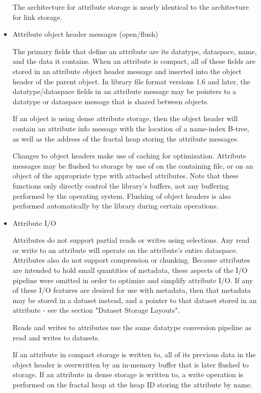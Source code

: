 \begin{itemize}
The architecture for attribute storage is nearly identical to the architecture for link storage.

    \item Attribute object header messages (open/flush)

The primary fields that define an attribute are its datatype, dataspace, name, and the data it contains. When an attribute is compact, all of these fields are stored in an attribute object header message and inserted into the object header of the parent object. In library file format versions 1.6 and later, the datatype/dataspace fields in an attribute message may be pointers to a datatype or dataspace message that is shared between objects.

If an object is using dense attribute storage, then the object header will contain an attribute info message with the location of a name-index B-tree, as well as the address of the fractal heap storing the attribute messages.

Changes to object headers make use of caching for optimization. Attribute messages may be flushed to storage by use of  on the containing file, or  on an object of the appropriate type with attached attributes. Note that these functions only directly control the library's buffers, not any buffering performed by the operating system. Flushing of object headers is also performed automatically by the library during certain operations.

    \item Attribute I/O

Attributes do not support partial reads or writes using selections. Any read or write to an attribute will operate on the attribute's entire dataspace. Attributes also do not support compression or chunking. Because attributes are intended to hold small quantities of metadata, these aspects of the I/O pipeline were omitted in order to optimize and simplify attribute I/O. If any of these I/O features are desired for use with metadata, then that metadata may be stored in a dataset instead, and a pointer to that dataset stored in an attribute - see the section "Dataset Storage Layouts".

Reads and writes to attributes use the same datatype conversion pipeline as read and writes to datasets.

If an attribute in compact storage is written to, all of its previous data in the object header is overwritten by an in-memory buffer that is later flushed to storage. If an attribute in dense storage is written to, a write operation is performed on the fractal heap at the heap ID storing the attribute by name.


\end{itemize}
